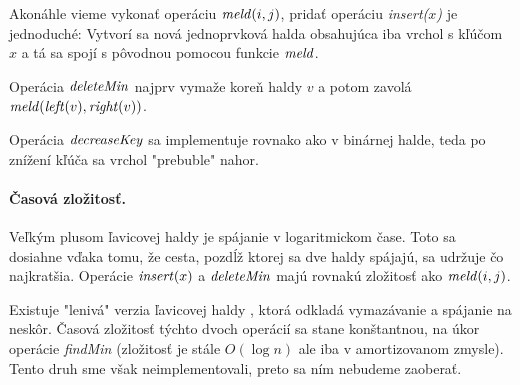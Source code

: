 Akonáhle vieme vykonať operáciu $\mathop{\mathit{meld}}(i,j)$, pridať operáciu
\emph{insert($x$)} je jednoduché: Vytvorí sa nová jednoprvková 
halda obsahujúca iba vrchol s kľúčom $x$ a tá sa spojí s pôvodnou pomocou funkcie $\mathop{\mathit{meld}}$.

Operácia $\mathop{\mathit{deleteMin}}$ najprv vymaže koreň haldy $v$ a potom zavolá $\mathop{\mathit{meld}}(\mathop{\mathit{left}}(v), \mathop{\mathit{right}}(v))$.

Operácia $\mathop{\mathit{decreaseKey}}$ sa implementuje rovnako ako v binárnej halde, teda po znížení kľúča sa vrchol "prebuble" nahor.

\paragraph{Časová zložitosť.}
Veľkým plusom ľavicovej haldy je spájanie v logaritmickom čase. 
Toto sa dosiahne vďaka tomu, že cesta, pozdĺž ktorej sa dve haldy spájajú, sa udržuje čo 
najkratšia. Operácie $\mathop{\mathit{insert}}(x)$ a $\mathop{\mathit{deleteMin}}$ majú rovnakú zložitosť ako $\mathop{\mathit{meld}}(i,j)$.

Existuje "lenivá" verzia ľavicovej haldy \citep{left}, ktorá odkladá vymazávanie a spájanie na neskôr.
Časová zložitosť týchto dvoch operácií sa stane konštantnou, na úkor operácie \emph{findMin} (zložitosť
je stále $O(\log n)$ ale iba v amortizovanom zmysle).
Tento druh sme však neimplementovali, preto sa ním nebudeme zaoberať.
